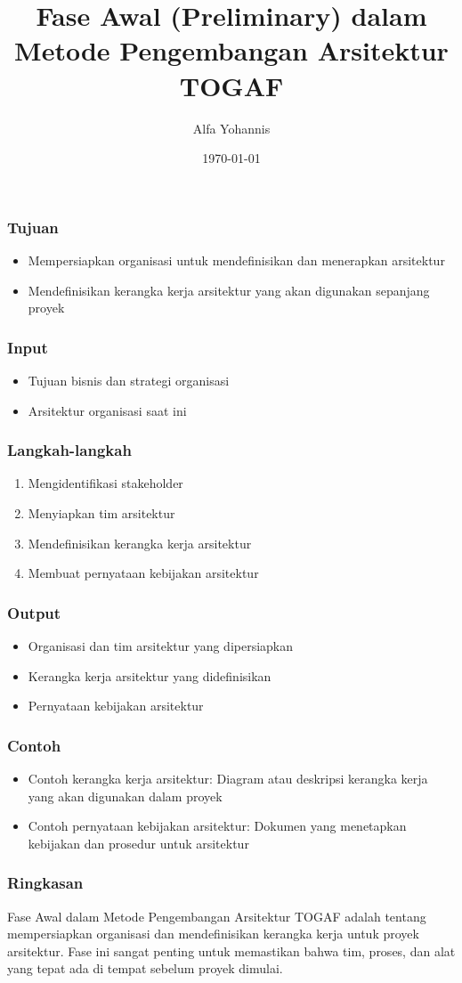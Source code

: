 \documentclass{beamer}
\title{Fase Awal (Preliminary) dalam Metode Pengembangan Arsitektur TOGAF}
\author{Alfa Yohannis}
\date{\today}
\begin{document}
\frame{\titlepage}

\begin{frame}
\frametitle{Tujuan}
\begin{itemize}
\item Mempersiapkan organisasi untuk mendefinisikan dan menerapkan arsitektur
\item Mendefinisikan kerangka kerja arsitektur yang akan digunakan sepanjang proyek
\end{itemize}
\end{frame}

\begin{frame}
\frametitle{Input}
\begin{itemize}
\item Tujuan bisnis dan strategi organisasi
\item Arsitektur organisasi saat ini
\end{itemize}
\end{frame}

\begin{frame}
\frametitle{Langkah-langkah}
\begin{enumerate}
\item Mengidentifikasi stakeholder
\item Menyiapkan tim arsitektur
\item Mendefinisikan kerangka kerja arsitektur
\item Membuat pernyataan kebijakan arsitektur
\end{enumerate}
\end{frame}

\begin{frame}
\frametitle{Output}
\begin{itemize}
\item Organisasi dan tim arsitektur yang dipersiapkan
\item Kerangka kerja arsitektur yang didefinisikan
\item Pernyataan kebijakan arsitektur
\end{itemize}
\end{frame}

\begin{frame}
\frametitle{Contoh}
\begin{itemize}
\item Contoh kerangka kerja arsitektur: Diagram atau deskripsi kerangka kerja yang akan digunakan dalam proyek
\item Contoh pernyataan kebijakan arsitektur: Dokumen yang menetapkan kebijakan dan prosedur untuk arsitektur
\end{itemize}
\end{frame}

\begin{frame}
\frametitle{Ringkasan}
Fase Awal dalam Metode Pengembangan Arsitektur TOGAF adalah tentang mempersiapkan organisasi dan mendefinisikan kerangka kerja untuk proyek arsitektur. Fase ini sangat penting untuk memastikan bahwa tim, proses, dan alat yang tepat ada di tempat sebelum proyek dimulai.
\end{frame}
\end{document}
